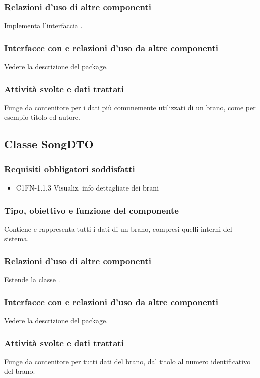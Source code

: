 \subsubsection*{Relazioni d'uso di altre componenti}
Implementa l'interfaccia .
\subsubsection*{Interfacce con e relazioni d'uso da altre componenti}
Vedere la descrizione del package.
\subsubsection*{Attivit\`a svolte e dati trattati}
Funge da contenitore per i dati pi\`u comunemente utilizzati di un brano, come
per esempio titolo ed autore.

\subsection{Classe SongDTO}
\subsubsection*{Requisiti obbligatori soddisfatti}
\begin{itemize}
	\item C1FN-1.1.3 Visualiz. info dettagliate dei brani
\end{itemize}
\subsubsection*{Tipo, obiettivo e funzione del componente}
Contiene e rappresenta tutti i dati di un brano, compresi quelli interni del
sistema. 
\subsubsection*{Relazioni d'uso di altre componenti}
Estende la classe .
\subsubsection*{Interfacce con e relazioni d'uso da altre componenti}
Vedere la descrizione del package.
\subsubsection*{Attivit\`a svolte e dati trattati}
Funge da contenitore per tutti dati del brano, dal titolo al numero
identificativo del brano. 

